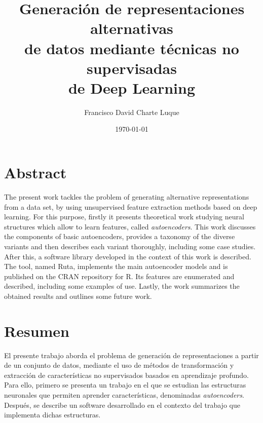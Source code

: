 \documentclass[oneside,openright,titlepage,numbers=noenddot,openany,headinclude,footinclude=true,
cleardoublepage=empty,abstractoff,BCOR=5mm,paper=a4,fontsize=12pt,main=spanish]{scrreprt}
\author{Francisco David Charte Luque}
\date{\today}
\title{Generación de representaciones alternativas\\de datos mediante técnicas no supervisadas\\de Deep Learning}
\begin{document}
\maketitle
\tableofcontents

\clearpage

\section*{Abstract}

The present work tackles the problem of generating alternative representations from a data set, by using unsupervised feature extraction methods based on deep learning. For this purpose, firstly it presents theoretical work studying neural structures which allow to learn features, called \textit{autoencoders}. This work discusses the components of basic autoencoders, provides a taxonomy of the diverse variants and then describes each variant thoroughly, including some case studies. After this, a software library developed in the context of this work is described. The tool, named Ruta, implements the main autoencoder models and is published on the CRAN repository for R. Its features are enumerated and described, including some examples of use. Lastly, the work summarizes the obtained results and outlines some future work. 

\section*{Resumen}

El presente trabajo aborda el problema de generación de representaciones a partir de un conjunto de datos, mediante el uso de métodos de transformación y extracción de características no supervisados basados en aprendizaje profundo. Para ello, primero se presenta un trabajo en el que se estudian las estructuras neuronales que permiten aprender características, denominadas \textit{autoencoders}. Después, se describe un software desarrollado en el contexto del trabajo que implementa dichas estructuras.
\end{document}
